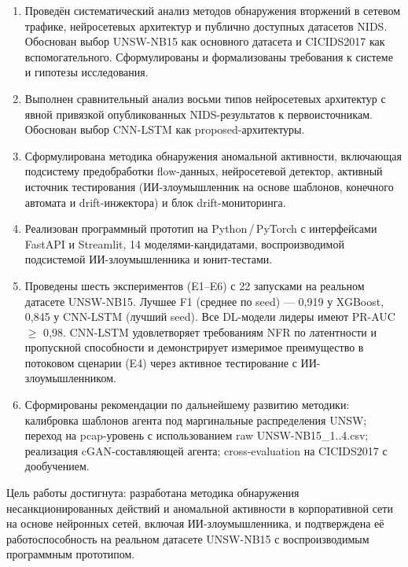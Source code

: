 \documentclass[14pt, a4paper]{extarticle}
\begin{document}
\begin{enumerate}
    \item Проведён систематический анализ методов обнаружения вторжений в
    сетевом трафике, нейросетевых архитектур и публично доступных датасетов
    NIDS. Обоснован выбор UNSW-NB15 как основного датасета и CICIDS2017 как
    вспомогательного. Сформулированы и формализованы требования к системе
    и гипотезы исследования.
    \item Выполнен сравнительный анализ восьми типов нейросетевых
    архитектур с явной привязкой опубликованных NIDS-результатов к
    первоисточникам. Обоснован выбор CNN-LSTM как proposed-архитектуры.
    \item Сформулирована методика обнаружения аномальной активности,
    включающая подсистему предобработки flow-данных, нейросетевой
    детектор, активный источник тестирования (ИИ-злоумышленник на основе
    шаблонов, конечного автомата и drift-инжектора) и блок drift-мониторинга.
    \item Реализован программный прототип на Python\,/\,PyTorch с
    интерфейсами FastAPI и Streamlit, 14 моделями-кандидатами,
    воспроизводимой подсистемой ИИ-злоумышленника и юнит-тестами.
    \item Проведены шесть экспериментов (E1--E6) с 22 запусками на
    реальном датасете UNSW-NB15. Лучшее F1 (среднее по seed) ---
    0{,}919 у XGBoost, 0{,}845 у CNN-LSTM (лучший seed). Все DL-модели
    лидеры имеют PR-AUC $\geq$ 0{,}98. CNN-LSTM удовлетворяет
    требованиям NFR по латентности и пропускной способности и
    демонстрирует измеримое преимущество в потоковом сценарии (E4)
    через активное тестирование с ИИ-злоумышленником.
    \item Сформированы рекомендации по дальнейшему развитию методики:
    калибровка шаблонов агента под маргинальные распределения UNSW;
    переход на pcap-уровень с использованием raw UNSW-NB15\_1..4.csv;
    реализация cGAN-составляющей агента; cross-evaluation на
    CICIDS2017 с дообучением.
\end{enumerate}

Цель работы достигнута: разработана методика обнаружения
несанкционированных действий и аномальной активности в корпоративной
сети на основе нейронных сетей, включая ИИ-злоумышленника, и подтверждена
её работоспособность на реальном датасете UNSW-NB15 с воспроизводимым
программным прототипом.

\printbibliography[title={СПИСОК ИСПОЛЬЗОВАННЫХ ИСТОЧНИКОВ}]
\end{document}
